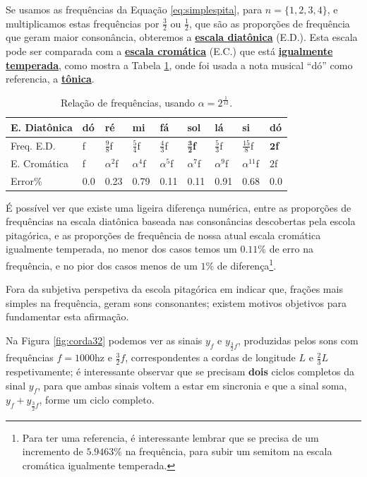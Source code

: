 Se usamos as frequências da Equação \ref{eq:simplespita}, para $n=\{1,2,3,4\}$,
e multiplicamos estas frequências por $\frac{3}{2}$ ou $\frac{1}{2}$, que
são as proporções de frequência que geram maior consonância,
obteremos a \hyperref[sec:pos:Diatonica]{\textbf{escala diatônica}} (E.D.).
Esta escala pode ser comparada com a \hyperref[sec:pos:Cromatica]{\textbf{escala cromática}} (E.C.)
que está \hyperref[subsec:tempigual]{\textbf{igualmente temperada}}, 
como mostra a Tabela \ref{tab:pitagorascromatica}, onde foi usada a nota musical ``dó'' como referencia, a \hyperref[sec:Tonica]{\textbf{tônica}}.
\begin{table}[h]
  \centering
  \begin{tabular}{|l|l|l|l|l|l|l|l|l|}
  \hline
  E. Diatônica  & dó & ré & mi & fá & sol & lá & si & dó \\ \hline
  \hline
  Freq. E.D.  & f  & $\frac{9}{8}$f & $\frac{5}{4}$f & $\frac{4}{3}$f & $\mathbf{\frac{3}{2}}$\textbf{f} & $\frac{5}{3}$f & $\frac{15}{8}$f & $\mathbf{2}$\textbf{f}\\ \hline
  E. Cromática & f  & $\alpha^{2}$f  & $\alpha^{4}$f  & $\alpha^{5}$f  & $\alpha^{7}$f  & $\alpha^{9}$f  & $\alpha^{11}$f  & $2$f\\ \hline \hline
  Error$\%$ &  0.0 & 0.23 & 0.79 & 0.11 & 0.11 & 0.91 & 0.68 & 0.0 \\ \hline
  \end{tabular}
  \caption{Relação de frequências, usando $\alpha=2^\frac{1}{12}$.}
  \label{tab:pitagorascromatica}
\end{table}

É possível ver que existe uma ligeira diferença numérica, 
entre as proporções de frequências na escala diatônica baseada nas consonâncias descobertas pela escola pitagórica,
e as proporções de frequência de nossa atual escala cromática igualmente temperada,
no menor dos casos temos um $0.11\%$ de erro na frequência, 
e no pior dos casos menos de um $1\%$ de diferença\footnote{Para ter uma referencia,
é interessante lembrar que se precisa de um incremento de $5.9463\%$ na frequência, 
para subir um semitom na escala cromática igualmente temperada.}.

Fora da subjetiva perspetiva da escola pitagórica em indicar que, 
frações mais simples na frequência, 
geram sons consonantes; 
existem motivos objetivos para fundamentar esta afirmação.

Na Figura \ref{fig:corda32} podemos ver as sinais $y_{f}$ e $y_{\frac{3}{2}f}$, 
produzidas pelos sons com frequências $f=1000$hz e $\frac{3}{2}f$,
correspondentes a cordas de longitude $L$ e $\frac{2}{3}L$ respetivamente;
é interessante observar que se precisam \textbf{dois} ciclos completos da sinal $y_{f}$,
para que ambas sinais voltem a estar em sincronia e que a sinal soma, $y_{f}+y_{\frac{3}{2}f}$, forme um ciclo completo.


